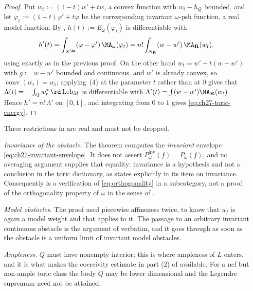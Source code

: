 \begin{proof}
Put \(w_t:=(1-t)w'+tw\), a convex function with \(w_t-h_Q\) bounded, and let
\(\varphi_t:=(1-t)\varphi'+t\varphi\) be the corresponding invariant
\(\omega\)-psh function, a real model function.  By
, \(h(t):=E_\omega(\varphi_t)\) is
differentiable with
\[
 h'(t)=\int_{X^{\An}}(\varphi-\varphi')\,\MA_\omega(\varphi_t)
 =n!\int_{N_{\mathbf R}}(w-w')\,\MA_{\mathbf R}(w_t),
\]
using  exactly as in the previous proof.  On the
other hand \(w_t=w'+t(w-w')\) with \(g:=w-w'\) bounded and continuous, and
\(w'\) is already convex, so \(\operatorname{conv}(w_t)=w_t\); applying
\,(4) at the parameter \(t\) rather
than at \(0\) gives that
\(\Lambda(t)=-\int_Qw_t^{*}\,\rd\operatorname{Leb}_M\) is differentiable
with
\(\Lambda'(t)=\int(w-w')\MA_{\mathbf R}(w_t)\).  Hence
\(h'=n!\,\Lambda'\) on \([0,1]\), and integrating from \(0\) to \(1\) gives
\eqref{eq:ch27-toric-energy}.
\end{proof}

\begin{remark}
\label{rem:ch27-toric-scope}
Three restrictions in  are real and must
not be dropped.

\emph{Invariance of the obstacle.}  The theorem computes the
\emph{invariant} envelope \eqref{eq:ch27-invariant-envelope}.  It does not
assert \(P^{\mathrm{inv}}_\omega(f)=P_\omega(f)\), and no averaging argument
supplies that equality: invariance is a hypothesis and not a conclusion in
the toric dictionary, as  states explicitly
in its item on invariance.  Consequently
 is a verification of
\eqref{eq:orthogonality} in a subcategory, not a proof of the orthogonality
property of \(\omega\) in the sense of
.

\emph{Model obstacles.}  The proof used piecewise affineness twice, to know
that \(u_f\) is again a model weight and that
 applies to it.  The passage to an arbitrary
invariant continuous obstacle is the argument of
 verbatim, and it goes through
as soon as the obstacle is a uniform limit of invariant model obstacles.

\emph{Ampleness.}  \(Q\) must have nonempty interior; this is where
ampleness of \(L\) enters, and it is what makes the coercivity estimate in
part (2) of  available.  For a nef but
non-ample toric class the body \(Q\) may be lower dimensional and the
Legendre supremum need not be attained.
\end{remark}

